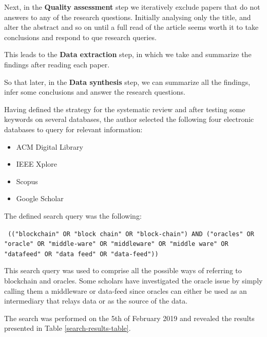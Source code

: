 Next, in the \textbf{Quality assessment} step we iteratively exclude papers that do not answers to any of the research questions. Initially analysing only the title, and alter the abstract and so on until a full read of the article seems worth it to take conclusions and respond to que research queries.

This leads to the \textbf{Data extraction} step, in which we take and summarize the findings after reading each paper.

So that later, in the \textbf{Data synthesis} step, we can summarize all the findings, infer some conclusions and answer the research questions.

Having defined the strategy for the systematic review and after testing some keywords on several databases, the author selected the following four electronic databases to query for relevant information:

\begin{itemize}
  \item ACM Digital Library
  \item IEEE Xplore
  \item Scopus
  \item Google Scholar
\end{itemize}


The defined search query was the following:

\texttt{
  (("blockchain" OR "block chain" OR "block-chain")
  AND
  ("oracles" OR "oracle" OR "middle-ware" OR "middleware" OR "middle ware" OR "datafeed" OR "data feed" OR "data-feed"))
}


This search query was used to comprise all the possible ways of referring to blockchain and oracles. Some scholars have investigated the oracle issue by simply calling them a middleware or data-feed since oracles can either be used as an intermediary that relays data or as the source of the data.

The search was performed on the 5th of February 2019 and revealed the results presented in Table \ref{search-results-table}.

